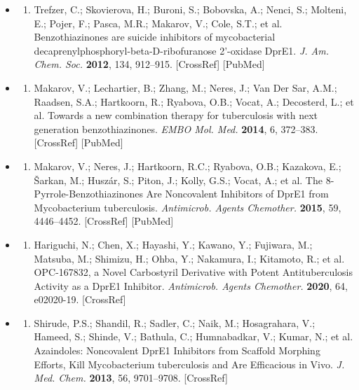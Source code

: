 \documentclass{article}
\begin{document}
\begin{itemize}
\begin{enumerate}
\end{enumerate}

\item \begin{enumerate}
\item 
Trefzer, C.; Skovierova, H.; Buroni, S.; Bobovska, A.; Nenci, S.; Molteni, E.; Pojer, F.; Pasca, M.R.; Makarov, V.; Cole, S.T.; et al. Benzothiazinones are suicide inhibitors of mycobacterial decaprenylphosphoryl-beta-D-ribofuranose 2'-oxidase DprE1. \textit{J. Am. Chem. Soc.} \textbf{2012}, 134, 912–915. [CrossRef] [PubMed]

\end{enumerate}

\item \begin{enumerate}
\item 
Makarov, V.; Lechartier, B.; Zhang, M.; Neres, J.; Van Der Sar, A.M.; Raadsen, S.A.; Hartkoorn, R.; Ryabova, O.B.; Vocat, A.; Decosterd, L.; et al. Towards a new combination therapy for tuberculosis with next generation benzothiazinones. \textit{EMBO Mol. Med.} \textbf{2014}, 6, 372–383. [CrossRef] [PubMed]

\end{enumerate}

\item \begin{enumerate}
\item 
Makarov, V.; Neres, J.; Hartkoorn, R.C.; Ryabova, O.B.; Kazakova, E.; Šarkan, M.; Huszár, S.; Piton, J.; Kolly, G.S.; Vocat, A.; et al. The 8-Pyrrole-Benzothiazinones Are Noncovalent Inhibitors of DprE1 from Mycobacterium tuberculosis. \textit{Antimicrob. Agents Chemother.} \textbf{2015}, 59, 4446–4452. [CrossRef] [PubMed]

\end{enumerate}

\item \begin{enumerate}
\item 
Hariguchi, N.; Chen, X.; Hayashi, Y.; Kawano, Y.; Fujiwara, M.; Matsuba, M.; Shimizu, H.; Ohba, Y.; Nakamura, I.; Kitamoto, R.; et al. OPC-167832, a Novel Carbostyril Derivative with Potent Antituberculosis Activity as a DprE1 Inhibitor. \textit{Antimicrob. Agents Chemother.} \textbf{2020}, 64, e02020-19. [CrossRef]

\end{enumerate}

\item \begin{enumerate}
\item 
Shirude, P.S.; Shandil, R.; Sadler, C.; Naik, M.; Hosagrahara, V.; Hameed, S.; Shinde, V.; Bathula, C.; Humnabadkar, V.; Kumar, N.; et al. Azaindoles: Noncovalent DprE1 Inhibitors from Scaffold Morphing Efforts, Kill Mycobacterium tuberculosis and Are Efficacious in Vivo. \textit{J. Med. Chem.} \textbf{2013}, 56, 9701–9708. [CrossRef]


\end{enumerate}
\end{itemize}
\end{document}
